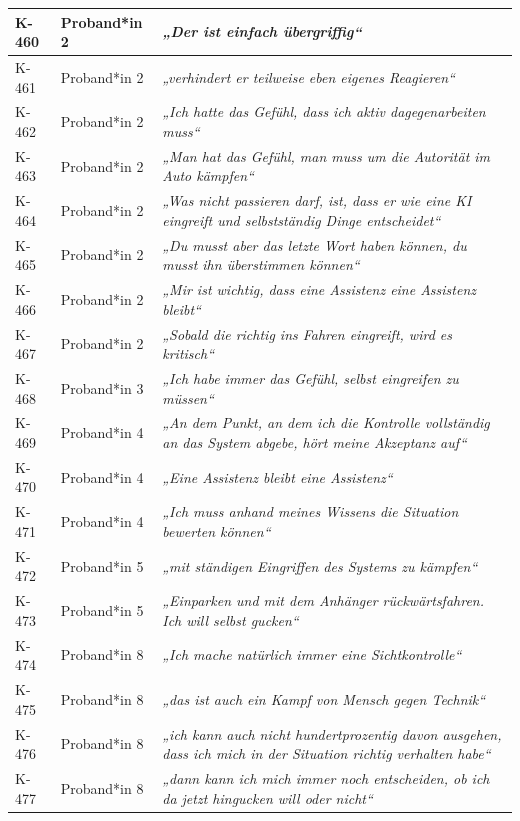 {\begin{xltabular}{\textwidth}{
    |P{0.10\textwidth}
    |P{0.17\textwidth}
    |Y|
}
K-460 & Proband*in 2 & \textit{„Der ist einfach übergriffig“} \\
\hline
K-461 & Proband*in 2 & \textit{„verhindert er teilweise eben eigenes Reagieren“} \\
\hline
K-462 & Proband*in 2 & \textit{„Ich hatte das Gefühl, dass ich aktiv dagegenarbeiten muss“} \\
\hline
K-463 & Proband*in 2 & \textit{„Man hat das Gefühl, man muss um die Autorität im Auto kämpfen“} \\
\hline
K-464 & Proband*in 2 & \textit{„Was nicht passieren darf, ist, dass er wie eine KI eingreift und selbstständig Dinge entscheidet“} \\
\hline
K-465 & Proband*in 2 & \textit{„Du musst aber das letzte Wort haben können, du musst ihn überstimmen können“} \\
\hline
K-466 & Proband*in 2 & \textit{„Mir ist wichtig, dass eine Assistenz eine Assistenz bleibt“} \\
\hline
K-467 & Proband*in 2 & \textit{„Sobald die richtig ins Fahren eingreift, wird es kritisch“} \\
\hline
K-468 & Proband*in 3 & \textit{„Ich habe immer das Gefühl, selbst eingreifen zu müssen“} \\
\hline
K-469 & Proband*in 4 & \textit{„An dem Punkt, an dem ich die Kontrolle vollständig an das System abgebe, hört meine Akzeptanz auf“} \\
\hline
K-470 & Proband*in 4 & \textit{„Eine Assistenz bleibt eine Assistenz“} \\
\hline
K-471 & Proband*in 4 & \textit{„Ich muss anhand meines Wissens die Situation bewerten können“} \\
\hline
K-472 & Proband*in 5 & \textit{„mit ständigen Eingriffen des Systems zu kämpfen“} \\
\hline
K-473 & Proband*in 5 & \textit{„Einparken und mit dem Anhänger rückwärtsfahren. Ich will selbst gucken“} \\
\hline
K-474 & Proband*in 8 & \textit{„Ich mache natürlich immer eine Sichtkontrolle“} \\
\hline
K-475 & Proband*in 8 & \textit{„das ist auch ein Kampf von Mensch gegen Technik“} \\
\hline
K-476 & Proband*in 8 & \textit{„ich kann auch nicht hundertprozentig davon ausgehen, dass ich mich in der Situation richtig verhalten habe“} \\
\hline
K-477 & Proband*in 8 & \textit{„dann kann ich mich immer noch entscheiden, ob ich da jetzt hingucken will oder nicht“} \\

\end{xltabular}}
